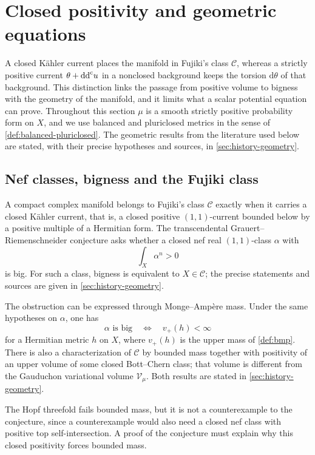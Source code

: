 \section{Closed positivity and geometric equations}
\label{sec:non-kahler-geometric-problems}

A closed K\"ahler current places the manifold in Fujiki's class $\mathcal C$, whereas a strictly positive current $\theta+\mathrm{dd}^{\mathrm{c}} u$ in a nonclosed background keeps the torsion $\mathrm{d}\theta$ of that background. This distinction links the passage from positive volume to bigness with the geometry of the manifold, and it limits what a scalar potential equation can prove. Throughout this section $\mu$ is a smooth strictly positive probability form on $X$, and we use balanced and pluriclosed metrics in the sense of \cref{def:balanced-pluriclosed}. The geometric results from the literature used below are stated, with their precise hypotheses and sources, in \cref{sec:history-geometry}.

\subsection{Nef classes, bigness and the Fujiki class}

A compact complex manifold belongs to Fujiki's class $\mathcal C$ exactly when it carries a closed K\"ahler current, that is, a closed positive $(1,1)$-current bounded below by a positive multiple of a Hermitian form. The transcendental Grauert--Riemenschneider conjecture asks whether a closed nef real $(1,1)$-class $\alpha$ with
\[
 \int_X\alpha^n>0
\]
is big. For such a class, bigness is equivalent to $X\in\mathcal C$; the precise statements and sources are given in \cref{sec:history-geometry}.

The obstruction can be expressed through Monge--Amp\`ere mass. Under the same hypotheses on $\alpha$, one has
\[
 \alpha\text{ is big}\quad\Longleftrightarrow\quad v_+(h)<\infty
\]
for a Hermitian metric $h$ on $X$, where $v_+(h)$ is the upper mass of \cref{def:bmp}. There is also a characterization of $\mathcal C$ by bounded mass together with positivity of an upper volume of some closed Bott--Chern class; that volume is different from the Gauduchon variational volume $\mathcal V_\mu$. Both results are stated in \cref{sec:history-geometry}.

The Hopf threefold fails bounded mass, but it is not a counterexample to the conjecture, since a counterexample would also need a closed nef class with positive top self-intersection. A proof of the conjecture must explain why this closed positivity forces bounded mass.

